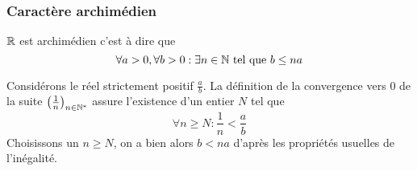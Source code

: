 \subsubsection{Caractère archimédien}
\begin{prop}
$\mathbb{R}$ est archimédien c'est à dire que 
\begin{displaymath}
 \forall a> 0 , \forall b> 0 : \exists n\in \mathbb{N} \text{ tel que } b \leq na
\end{displaymath}
\end{prop}
\begin{demo}
 Considérons le réel strictement positif $\frac{a}{b}$. La définition de la convergence vers $0$ de la suite $\left(   \frac{1}{n} \right)_{n\in\mathbb{N}^*}$ assure l'existence d'un entier $N$ tel que 
\begin{displaymath}
 \forall n \geq N : \frac{1}{n}<\frac{a}{b}
\end{displaymath}
Choisissons un $n\geq N$, on a bien alors $b<na$ d'après les propriétés usuelles de l'inégalité.
\end{demo}

